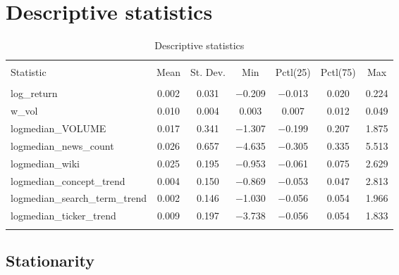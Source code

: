 \section{Descriptive statistics}
\begin{table}[!htbp] \centering 
  \caption{Descriptive statistics} 
  \label{tab:desc_stat} 
\begin{tabular}{@{\extracolsep{5pt}}lcccccc} 
\\[-1.8ex]\hline 
\hline \\[-1.8ex] 
Statistic & \multicolumn{1}{c}{Mean} & \multicolumn{1}{c}{St. Dev.} & \multicolumn{1}{c}{Min} & \multicolumn{1}{c}{Pctl(25)} & \multicolumn{1}{c}{Pctl(75)} & \multicolumn{1}{c}{Max} \\ 
\hline \\[-1.8ex] 
log\_return & 0.002 & 0.031 & $-$0.209 & $-$0.013 & 0.020 & 0.224 \\ 
w\_vol & 0.010 & 0.004 & 0.003 & 0.007 & 0.012 & 0.049 \\ 
logmedian\_VOLUME & 0.017 & 0.341 & $-$1.307 & $-$0.199 & 0.207 & 1.875 \\ 
logmedian\_news\_count & 0.026 & 0.657 & $-$4.635 & $-$0.305 & 0.335 & 5.513 \\ 
logmedian\_wiki & 0.025 & 0.195 & $-$0.953 & $-$0.061 & 0.075 & 2.629 \\ 
logmedian\_concept\_trend & 0.004 & 0.150 & $-$0.869 & $-$0.053 & 0.047 & 2.813 \\ 
logmedian\_search\_term\_trend & 0.002 & 0.146 & $-$1.030 & $-$0.056 & 0.054 & 1.966 \\ 
logmedian\_ticker\_trend & 0.009 & 0.197 & $-$3.738 & $-$0.056 & 0.054 & 1.833 \\ 
\hline \\[-1.8ex] 
\end{tabular} 
\end{table} 

\clearpage

\subsection*{Stationarity}

